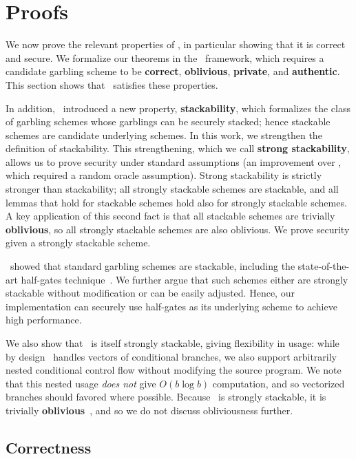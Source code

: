 \section{Proofs}\label{sec:proof}

We now prove the relevant properties of \ourscheme, in particular
showing that it is correct and secure.
We formalize our theorems in the~\cite{CCS:BelHoaRog12} framework,
which requires a candidate garbling scheme to be \textbf{correct},
\textbf{oblivious}, \textbf{private}, and \textbf{authentic}.
This section shows that \ourscheme\ satisfies these properties.

In addition, \HK\ introduced a new property, \textbf{stackability}, which
formalizes the class of garbling schemes whose garblings can be
securely stacked; hence stackable schemes are candidate underlying
schemes.
%
In this work, we strengthen the definition of stackability.  This
strengthening, which we call \textbf{strong stackability}, allows us to
prove security under standard assumptions (an improvement over \HK,
which required a random oracle assumption).
Strong stackability is strictly stronger than stackability; all
strongly
stackable schemes are stackable,
and all lemmas that hold for stackable schemes hold also for strongly
stackable schemes.
A key application of this second fact is that all stackable schemes
are trivially \textbf{oblivious}, so all strongly stackable schemes are
also oblivious.
We prove security given a strongly stackable scheme.

\HK\ showed that standard garbling schemes are stackable, including
the state-of-the-art half-gates technique~\cite{EC:ZahRosEva15}.
We further argue that such schemes either are strongly stackable without
modification or can be easily adjusted.
Hence, our implementation can securely use half-gates as its underlying
scheme to achieve high performance.

We also show that \ourscheme\ is itself strongly stackable, giving
flexibility in usage: while by design \ourscheme\ handles vectors
of conditional branches, we also support arbitrarily nested
conditional control flow without modifying the source program.
%
We note that this nested usage \emph{does not} give $O(b\log b)$
computation, and so vectorized branches should favored where possible.
Because \ourscheme\ is strongly stackable, it is trivially
\textbf{oblivious}~\HK,
and so we do not discuss obliviousness further.



\subsection{Correctness}\label{sec:correctness}

